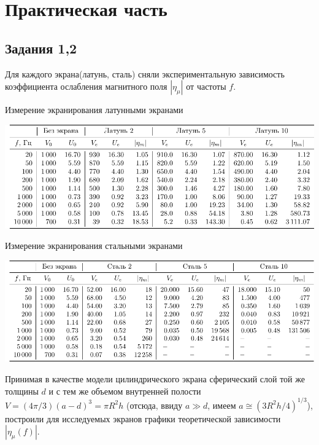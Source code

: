 \documentclass[a4paper,12pt]{article}
\begin{document}
\section{Практическая часть}
\subsection{Задания 1,2}
Для каждого экрана(латунь, сталь) сняли экспериментальную зависимость коэффициента ослабления магнитного поля $|\eta_{\mu}|$ от частоты $f$.
\begin{table}[h!]
	\caption{Измерение экранирования латунными экранами}
	\label{tab:6s1}
	\vspace{1em}
	\centering
	\includegraphics[width=\textwidth]{tables/table1}
\end{table}

\begin{table}[h!]
	\caption{Измерение экранирования стальными экранами}
	\label{tab:6s1}
	\vspace{1em}
	\centering
	\includegraphics[width=\textwidth]{tables/table2}
\end{table}
Принимая в качестве модели цилиндрического экрана сферический слой той же толщины $d$ и с тем же объемом внутренней полости $V=(4\pi/3)(a-d)^3=\pi R^2h$ (отсюда, ввиду $a\gg d$, имеем $a\cong (3R^2h/4)^{1/3}$), построили для исследуемых экранов графики теоретической зависимости $|\eta_{\mu}(f)|$.
\end{document}
